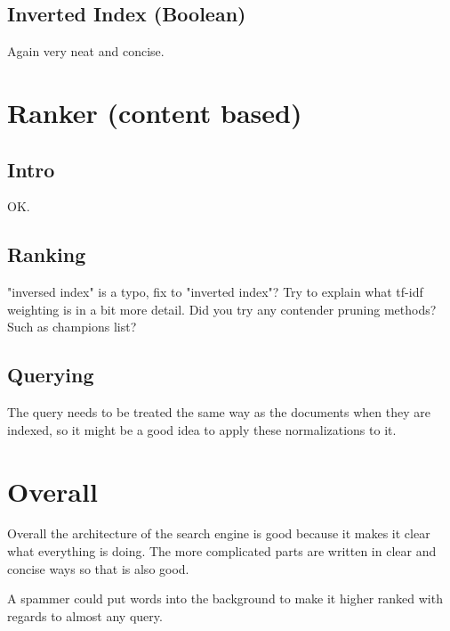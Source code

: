     \subsection{Inverted Index (Boolean)}
    Again very neat and concise.
    
\section*{Ranker (content based)}
    \subsection{Intro}
    OK.
    
    \subsection{Ranking}
    "inversed index" is a typo, fix to "inverted index"?
    Try to explain what tf-idf weighting is in a bit more detail.
    Did you try any contender pruning methods? Such as champions list?
    
    \subsection{Querying}
    The query needs to be treated the same way as the documents when they are indexed, so it might be a good idea to apply these normalizations to it.
    
\section*{Overall}
Overall the architecture of the search engine is good because it makes it clear what everything is doing. The more complicated parts are written in clear and concise ways so that is also good.

A spammer could put words into the background to make it higher ranked with regards to almost any query.

